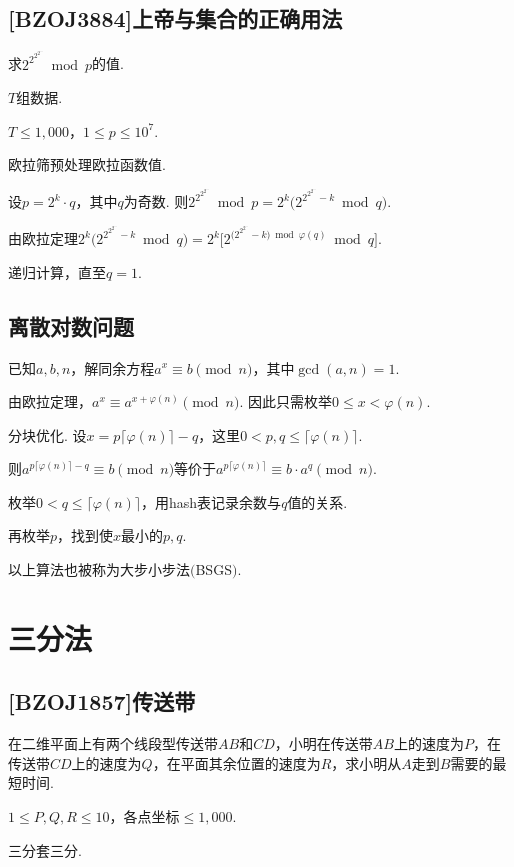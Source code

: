\documentclass[a4paper]{article}
\def\leq{\leqslant}
\begin{document}
    \subsection{[BZOJ3884]上帝与集合的正确用法}

    求$2^{2^{2^{2^{\cdots}}}}\bmod p$的值.

    $T$组数据.

    $T\leq 1,000$，\!\!$1\leq p\leq {10}^7$.

    欧拉筛预处理欧拉函数值.

    设$p=2^k\cdot q$，\!\!其中$q$为奇数. 则$2^{2^{2^{2^{\cdots}}}}\bmod p=2^k\bigg(2^{2^{2^{2^{\cdots}}}-k}\bmod q\bigg)$.

    由欧拉定理$2^k\bigg(2^{2^{2^{2^{\cdots}}}-k}\bmod q\bigg)=2^k\bigg[2^{\big(2^{2^{2^{\cdots}}}-k\big)\bmod\varphi(q)}\bmod q\bigg]$.

    递归计算，\!\!直至$q=1$.

    \subsection{离散对数问题}

    已知$a,b,n$，\!\!解同余方程$a^x\equiv b\pmod{n}$，\!\!其中$\gcd(a,n)=1$.

    由欧拉定理，\!\!$a^x\equiv a^{x+\varphi(n)}\pmod{n}$. 因此只需枚举$0\leq x<\varphi(n)$.
    
    分块优化. 设$x=p\big\lceil\varphi(n)\big\rceil-q$，\!\!这里$0<p,q\leq\lceil\varphi(n)\big\rceil$.

    则$a^{p\lceil\varphi(n)\rceil-q}\equiv b\pmod{n}$等价于$a^{p\lceil\varphi(n)\rceil}\equiv b\cdot a^q\pmod{n}$.

    枚举$0<q\leq\lceil\varphi(n)\big\rceil$，\!\!用hash表记录余数与$q$值的关系.

    再枚举$p$，\!\!找到使$x$最小的$p,q$.

    以上算法也被称为大步小步法$($BSGS$)$.

    \section{三分法}

    \subsection{[BZOJ1857]传送带}

    在二维平面上有两个线段型传送带$AB$和$CD$，\!\!小明在传送带$AB$上的速度为$P$，\!\!在传送带$CD$上的速度为$Q$，\!\!在平面其余位置的速度为$R$，\!\!求小明从$A$走到$B$需要的最短时间.

    $1\leq P,Q,R\leq 10$，\!\!各点坐标$\leq 1,000$.

    三分套三分.
\end{document}
